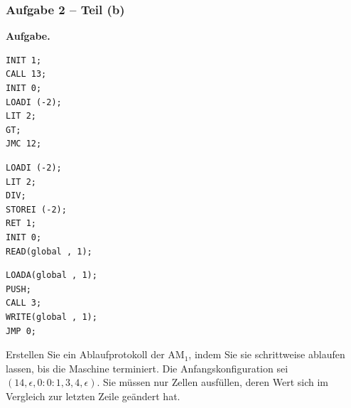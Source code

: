 \documentclass{beamer}
\begin{document}
\begin{frame}[fragile] \frametitle{Aufgabe 2 -- Teil (b)}
	\footnotesize
	\textbf{Aufgabe.}
	
	\begin{minipage}{\dimexpr0.33\linewidth-\fboxrule-\fboxsep}
		\begin{lstlisting}[style=am0]
INIT 1;
CALL 13;
INIT 0;
LOADI (-2);
LIT 2;
GT;
JMC 12;
		\end{lstlisting}
	\end{minipage}
	\begin{minipage}{\dimexpr0.33\linewidth-\fboxrule-\fboxsep}
		\begin{lstlisting}[style=am0, firstnumber=8]
LOADI (-2);
LIT 2;
DIV;
STOREI (-2);
RET 1;
INIT 0;
READ(global , 1);
		\end{lstlisting}
	\end{minipage}
	\begin{minipage}{\dimexpr0.33\linewidth-\fboxrule-\fboxsep}
		\begin{lstlisting}[style=am0, firstnumber=15]
LOADA(global , 1);
PUSH;
CALL 3;
WRITE(global , 1);
JMP 0;
		\end{lstlisting}
	\end{minipage}
	
	\bigskip
	
	Erstellen Sie ein Ablaufprotokoll der AM${}_\text{1}$, indem Sie sie schrittweise ablaufen lassen, bis die Maschine terminiert. Die Anfangskonfiguration sei $(14, \epsilon, 0 : 0 : 1, 3, 4, \epsilon)$. Sie müssen nur Zellen ausfüllen, deren Wert sich im Vergleich zur letzten Zeile geändert hat.
\end{frame}
\end{document}
